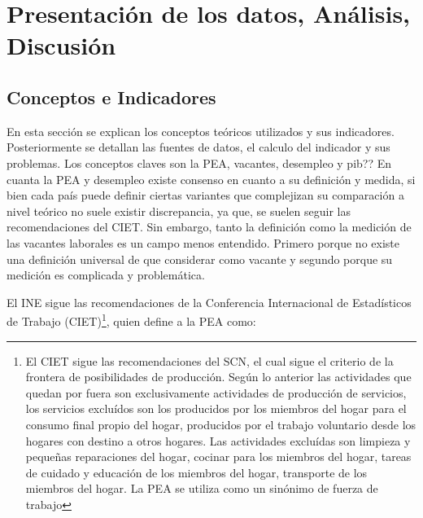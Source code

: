 \chapter{Presentación de los datos, Análisis, Discusión}




\section{Conceptos e Indicadores}

En esta sección se explican los conceptos teóricos utilizados y sus indicadores. Posteriormente se detallan las fuentes de datos, el calculo del indicador y sus problemas. Los conceptos claves son la PEA, vacantes, desempleo y pib?? 
En cuanta la PEA y desempleo existe consenso en cuanto a su definición y medida, si bien cada país puede definir ciertas variantes que complejizan su comparación a nivel teórico no suele existir discrepancia, ya que, se suelen seguir las recomendaciones del CIET.
Sin embargo, tanto la definición como la medición de las vacantes laborales es un campo menos entendido. Primero porque no existe una definición universal de que considerar como vacante y segundo porque su medición es complicada y problemática.


El INE sigue las recomendaciones de la Conferencia Internacional de Estadísticos de Trabajo (CIET)\footnote{El CIET sigue las recomendaciones del SCN, el cual sigue el criterio de la frontera de posibilidades de producción. Según lo anterior las actividades que quedan por fuera son exclusivamente actividades de producción de servicios, los servicios excluídos son los producidos por los miembros del hogar para el consumo final propio del hogar, producidos por el trabajo voluntario desde los hogares con destino a otros hogares. Las actividades excluídas son limpieza y pequeñas reparaciones del hogar, cocinar para los miembros del hogar, tareas de cuidado y educación de los miembros del hogar, transporte de los miembros del hogar. La PEA se utiliza como un sinónimo de fuerza de trabajo}, quien define a la PEA como:

